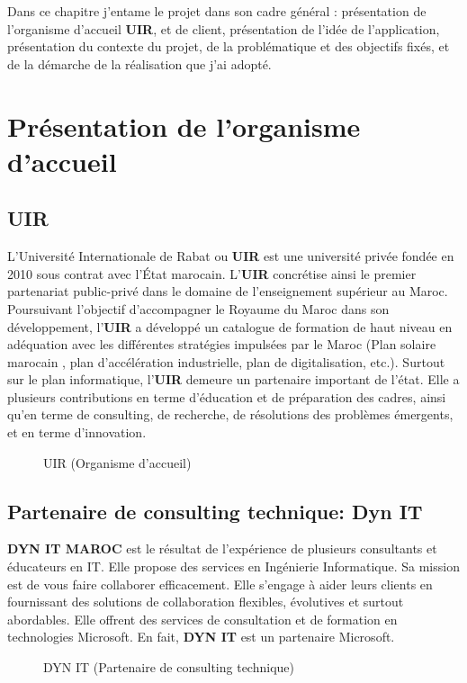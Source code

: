 Dans ce chapitre j'entame le projet dans son cadre général : présentation
de l’organisme d’accueil \textbf{UIR},
et de client, présentation de l'idée de l'application, présentation du
contexte du projet, de la problématique et des objectifs fixés,
et de la démarche de la réalisation que j'ai adopté.
\section{Présentation de l’organisme d’accueil}
\subsection{UIR}

L’Université Internationale de Rabat ou \textbf{UIR} est une université
privée fondée en 2010 sous contrat avec l’État marocain.
L'\textbf{UIR} concrétise ainsi le premier partenariat public-privé dans le
domaine de l'enseignement supérieur au Maroc.
Poursuivant l'objectif d'accompagner le Royaume du Maroc dans son
développement, l'\textbf{UIR} a développé un catalogue
de formation de haut niveau en adéquation avec les différentes stratégies
impulsées par le Maroc (Plan solaire marocain
, plan d'accélération industrielle, plan de digitalisation, etc.). Surtout
sur le plan informatique, l'\textbf{UIR} demeure
un partenaire important de l'état. Elle a plusieurs contributions en terme
d'éducation et de préparation des cadres, ainsi
qu'en terme de consulting, de recherche, de résolutions des problèmes
émergents, et en terme d’innovation.
\begin{figure}[H]
	\begin{center}
		\caption{UIR (Organisme d’accueil)}
	\end{center}
\end{figure}
\subsection{Partenaire de consulting technique: Dyn IT}

\textbf{DYN IT MAROC} est le résultat de l’expérience de plusieurs
consultants et éducateurs en IT.
Elle propose des services en Ingénierie Informatique.
Sa mission est de vous faire collaborer efficacement. Elle s'engage à aider leurs clients
en fournissant des solutions de collaboration flexibles, évolutives et
surtout abordables.
Elle offrent des services de consultation et de formation en technologies
Microsoft. En fait, \textbf{DYN IT} est un partenaire Microsoft.
\begin{figure}[H]
	\begin{center}
		\caption{DYN IT (Partenaire de consulting technique)}
	\end{center}
\end{figure}
